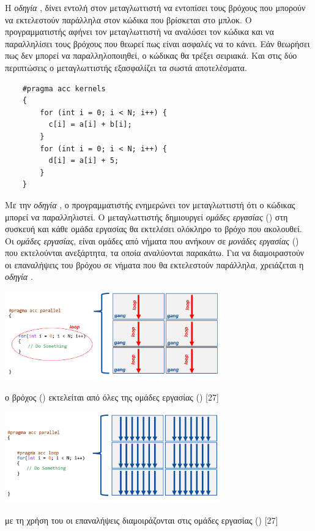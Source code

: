 Η \textit{οδηγία} , δίνει εντολή στον μεταγλωττιστή να εντοπίσει τους βρόχους που μπορούν να εκτελεστούν παράλληλα στον κώδικα που βρίσκεται στο μπλοκ. Ο προγραμματιστής αφήνει τον μεταγλωττιστή να αναλύσει τον κώδικα και να παραλληλίσει τους βρόχους που θεωρεί πως είναι ασφαλές να το κάνει. Εάν θεωρήσει πως δεν μπορεί να παραλληλοποιηθεί, ο κώδικας θα τρέξει σειριακά. Και στις δύο περιπτώσεις ο μεταγλωττιστής εξασφαλίζει τα σωστά αποτελέσματα.

\begin{center}
\begin{minipage}{0.5\textwidth}
\begin{verbatim}
    #pragma acc kernels
    {
        for (int i = 0; i < N; i++) {
          c[i] = a[i] + b[i];
        }
        for (int i = 0; i < N; i++) {
          d[i] = a[i] + 5;
        }
    }
\end{verbatim}
\end{minipage}
\end{center}

Με την \textit{οδηγία} , ο προγραμματιστής ενημερώνει τον μεταγλωττιστή ότι ο κώδικας μπορεί να παραλληλιστεί. Ο μεταγλωττιστής δημιουργεί \textit{ομάδες εργασίας} () στη συσκευή και κάθε ομάδα εργασίας θα εκτελέσει ολόκληρο το βρόχο που ακολουθεί. Οι \textit{ομάδες εργασίας}, είναι ομάδες από νήματα που ανήκουν σε \textit{μονάδες εργασίας} () που εκτελούνται ανεξάρτητα, τα οποία αναλύονται παρακάτω. Για να διαμοιραστούν οι επαναλήψεις του βρόχου σε νήματα που θα εκτελεστούν παράλληλα, χρειάζεται η \textit{οδηγία} . 
 
\begin{Illustration}[!h] 
	\centering
	\includegraphics[width=0.7\textwidth]{images/image056.png} 
	\caption{ο βρόχος () εκτελείται από όλες της ομάδες εργασίας () [27]}
	\label{image-3.13}
\end{Illustration}

 
\begin{Illustration}[!h] 
	\centering
	\includegraphics[width=0.7\textwidth]{images/image057.png} 
	\caption{με τη χρήση του  οι επαναλήψεις διαμοιράζονται στις ομάδες εργασίας () [27]}
	\label{image-3.14}
\end{Illustration}


